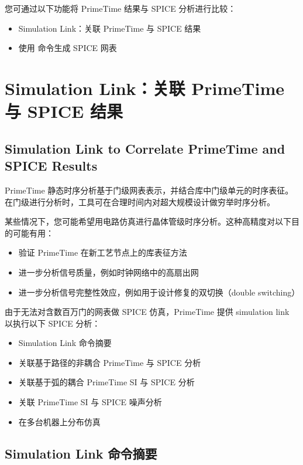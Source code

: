 \label{chap:spice}

您可通过以下功能将 PrimeTime 结果与 SPICE 分析进行比较：
\begin{itemize}
  \item Simulation Link：关联 PrimeTime 与 SPICE 结果
  \item 使用  命令生成 SPICE 网表
\end{itemize}

\section{Simulation Link：关联 PrimeTime 与 SPICE 结果}
\subsection*{Simulation Link to Correlate PrimeTime and SPICE Results}

PrimeTime 静态时序分析基于门级网表表示，并结合库中门级单元的时序表征。在门级进行分析时，工具可在合理时间内对超大规模设计做穷举时序分析。

某些情况下，您可能希望用电路仿真进行晶体管级时序分析。这种高精度对以下目的可能有用：
\begin{itemize}
  \item 验证 PrimeTime 在新工艺节点上的库表征方法
  \item 进一步分析信号质量，例如时钟网络中的高扇出网
  \item 进一步分析信号完整性效应，例如用于设计修复的双切换（double switching）
\end{itemize}

由于无法对含数百万门的网表做 SPICE 仿真，PrimeTime 提供 simulation link 以执行以下 SPICE 分析：
\begin{itemize}
  \item Simulation Link 命令摘要
  \item 关联基于路径的非耦合 PrimeTime 与 SPICE 分析
  \item 关联基于弧的耦合 PrimeTime SI 与 SPICE 分析
  \item 关联 PrimeTime SI 与 SPICE 噪声分析
  \item 在多台机器上分布仿真
\end{itemize}

\subsection{Simulation Link 命令摘要}
